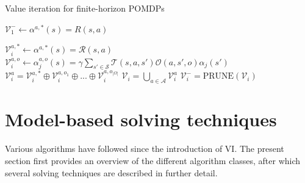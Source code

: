 \begin{algorithm}[H]
\caption{Value iteration for finite-horizon POMDPs}\label{alg:valitpo}
\begin{algorithmic}[1]


    \State $\mathcal{V}_1^{-} \leftarrow \alpha^{a,*}(s) = {R}(s,a)$
\EndFor
    
        \State $\mathcal{V}_i^{a,*} \leftarrow \alpha^{a,*}(s) = \mathcal{R}(s,a)$
                    \State $\mathcal{V}_i^{a,o} \leftarrow \alpha_j^{a,o}(s) = \gamma \sum_{s' \in \mathcal{S}} \mathcal{T}(s,a,s') \mathcal{O}(a,s',o) \alpha_{j}(s')$
                \EndFor
            \EndFor
        \EndFor
            \State $\mathcal{V}_i^{a} = \mathcal{V}_i^{a,*} \oplus \mathcal{V}_i^{a,o_1} \oplus ... \oplus \mathcal{V}_i^{a,o_{|\Omega|}}$
        \EndFor
        \State $\mathcal{V}_i = \bigcup_{a \in \mathcal{A}} \mathcal{V}_i^a$
        \State $\mathcal{V}_i^{-} = \text{PRUNE}(\mathcal{V}_i)$
    \EndFor
\EndProcedure
\end{algorithmic}
\end{algorithm}
\section{Model-based solving techniques}
\label{sec:stateart}
Various algorithms have followed since the introduction of VI. The present section first provides an overview of the different algorithm classes, after which several solving techniques are described in further detail.

